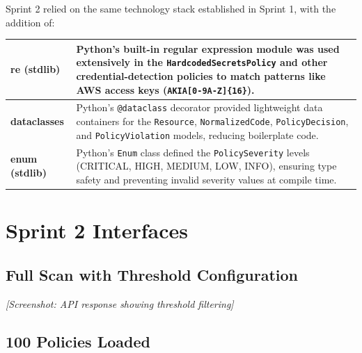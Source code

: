 Sprint 2 relied on the same technology stack established in Sprint 1, with the addition of:

\vspace{0.5cm}
\begin{tabular}{| m{2.5cm} | m{10cm} |}
\hline

\textbf{re (stdlib)} &
Python's built-in regular expression module was used extensively in the \texttt{HardcodedSecretsPolicy} and other credential-detection policies to match patterns like AWS access keys (\texttt{AKIA[0-9A-Z]\{16\}}).
\\
\hline

\textbf{dataclasses} &
Python's \texttt{@dataclass} decorator provided lightweight data containers for the \texttt{Resource}, \texttt{NormalizedCode}, \texttt{PolicyDecision}, and \texttt{PolicyViolation} models, reducing boilerplate code.
\\
\hline

\textbf{enum (stdlib)} &
Python's \texttt{Enum} class defined the \texttt{PolicySeverity} levels (CRITICAL, HIGH, MEDIUM, LOW, INFO), ensuring type safety and preventing invalid severity values at compile time.
\\
\hline

\end{tabular}

\section{Sprint 2 Interfaces}

\subsection{Full Scan with Threshold Configuration}


\textit{[Screenshot: API response showing threshold filtering]}

\subsection{100 Policies Loaded}

